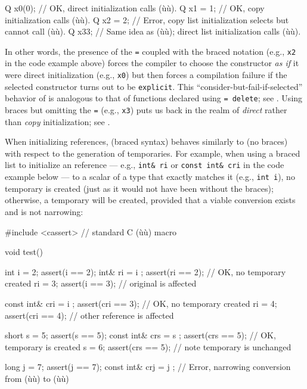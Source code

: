 \begin{emcppslisting}[emcppsbatch=e8]
Q x0(0);     // OK, direct initialization calls (ù{}ù).
Q x1 = 1;    // OK, copy initialization calls (ù{}ù).
Q x2 = {2};  // Error, copy list initialization selects but cannot call (ù{}ù).
Q x3{3};     // Same idea as (ù{}ù); direct list initialization calls (ù{}ù).
\end{emcppslisting}
    

\noindent In other words, the presence of the \lstinline!=! coupled with the braced
notation (e.g., \lstinline!x2! in the code example above) forces the
compiler to choose the constructor \emph{as if} it were direct
initialization (e.g., \lstinline!x0!) but then forces a compilation failure
if the selected constructor turns out to be \lstinline!explicit!. This
``consider-but-fail-if-selected'' behavior of  is analogous to that of functions declared using
\lstinline!=!~\lstinline!delete!; see . Using
braces but omitting the \lstinline!=! (e.g., \lstinline!x3!) puts us back in
the realm of \emph{direct} rather than \emph{copy} initialization; see
.

When initializing references,  (braced
syntax) behaves similarly to  (no braces)
with respect to the generation of temporaries. For example, when using a
braced list to initialize an  reference --- e.g.,
\lstinline!int&!~\lstinline!ri! or \lstinline!const!~\lstinline!int&!~\lstinline!cri!
in the code example below --- to a scalar of a type that exactly matches
it (e.g., \lstinline!int!~\lstinline!i!), no temporary is created (just as it
would not have been without the braces); otherwise, a temporary will be
created, provided that a viable conversion exists and is not narrowing:

\begin{emcppshiddenlisting}[emcppsbatch=e9]
#include <cassert>  // standard C (ù{}ù) macro
\end{emcppshiddenlisting}
\begin{emcppslisting}[emcppsbatch=e9]
void test()
{
    int  i = 2;               assert(i   == 2);
    int& ri = { i };          assert(ri  == 2);  // OK, no temporary created
    ri = 3;                   assert(i   == 3);  // original is affected

    const int& cri = { i };   assert(cri == 3);  // OK, no temporary created
    ri = 4;                   assert(cri == 4);  // other reference is affected

    short s = 5;              assert(s   == 5);
    const int& crs = { s };   assert(crs == 5);  // OK, temporary is created
    s = 6;                    assert(crs == 5);  // note temporary is unchanged

    long j = 7;               assert(j   == 7);
    const int& crj = { j };   // Error, narrowing conversion from (ù{}ù) to (ù{}ù)
}
\end{emcppslisting}
    

